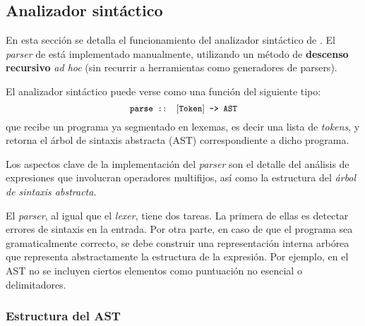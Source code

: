 \subsection{Analizador sintáctico}

En esta sección se detalla el funcionamiento
del analizador sintáctico de \nuflo.
El {\em parser} de \nuflo está implementado manualmente, utilizando un método de {\bf descenso recursivo}
{\em ad hoc} (sin recurrir a herramientas como generadores de parsers).

El analizador sintáctico puede verse como una función del siguiente tipo:
\[ {\small \texttt{parse :: $[$Token$]$ -> AST}} \]
que recibe un programa ya segmentado en lexemas, es decir una lista de {\em tokens},
y retorna el árbol de sintaxis abstracta (AST) correspondiente a dicho programa.

Los aspectos clave de la implementación del {\em parser} son
el detalle del análisis de expresiones que involucran operadores multifijos,
así como la estructura del {\em árbol de sintaxis abstracta}.

El {\em parser}, al igual que el {\em lexer}, tiene dos tareas.
La primera de ellas es detectar errores de sintaxis en la entrada.
Por otra parte, en caso de que el programa sea gramaticalmente correcto,
se debe construir una representación interna arbórea
que representa abstractamente la estructura de la expresión.
Por ejemplo, en el AST no se incluyen ciertos elementos como puntuación
no esencial o delimitadores.

\subsubsection{Estructura del AST}


